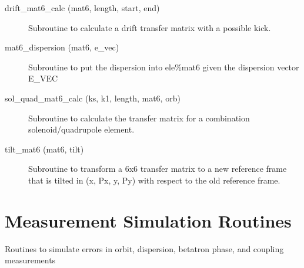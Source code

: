 \begin{description}

\item[drift_mat6_calc (mat6, length, start, end)] \Newline
Subroutine to calculate a drift transfer matrix with a possible kick. 

\item[mat6_dispersion (mat6, e_vec)] \Newline
Subroutine to put the dispersion into ele\%mat6 given the dispersion vector E_VEC 

\item[sol_quad_mat6_calc (ks, k1, length, mat6, orb)] \Newline
Subroutine to calculate the transfer matrix for a combination solenoid/quadrupole element. 

\item[tilt_mat6 (mat6, tilt)] \Newline
Subroutine to transform a 6x6 transfer matrix to a new reference frame that is 
tilted in (x, Px, y, Py) with respect to the old reference frame. 

\end{description}

\section{Measurement Simulation Routines}
\label{r:meas}  

Routines to simulate errors in orbit, dispersion, betatron phase, and
coupling measurements


